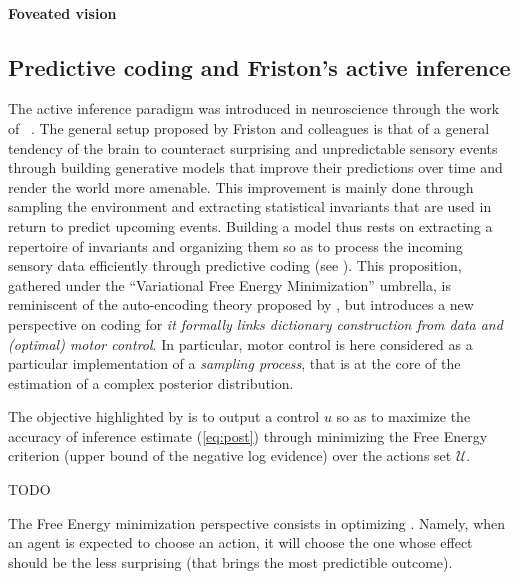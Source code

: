 \documentclass{article}
\begin{document}
\paragraph{Foveated vision}



\subsection{Predictive coding and Friston's active inference}

The active inference paradigm was introduced in neuroscience through the work of ~\cite{friston2010free,friston2012perceptions}. %
The general setup proposed by Friston and colleagues is that of a general tendency of the brain to counteract surprising and unpredictable sensory events through building generative models that improve their predictions over time and render the world more amenable. This improvement is mainly done through sampling the environment and extracting statistical invariants that are used in return to predict upcoming events.
Building a model thus rests on extracting a repertoire of invariants and organizing them so as to process the incoming sensory data efficiently through predictive coding (see \cite{rao1999predictive}). This proposition, gathered under the ``Variational Free Energy Minimization'' umbrella, is reminiscent of the auto-encoding theory proposed by \cite{hinton1994autoencoders}, but introduces a new perspective on coding
for \emph{it formally links dictionary construction from data and (optimal) motor control}.
In particular, motor control is here considered as a particular implementation of a \emph{sampling process}, that is at the core of the estimation of a complex posterior distribution. 


The objective highlighted by \cite{friston2012perceptions} is to output a control $u$ so as to maximize the accuracy of inference estimate (\ref{eq:post}) through minimizing the Free Energy criterion (upper bound of the negative log evidence) over the actions set $\mathcal{U}$. 


TODO

The Free Energy minimization perspective consists in optimizing . Namely, when  an agent is expected to choose an action, it will choose the one whose effect should be the less surprising (that brings the most predictible outcome). 


\end{document}
